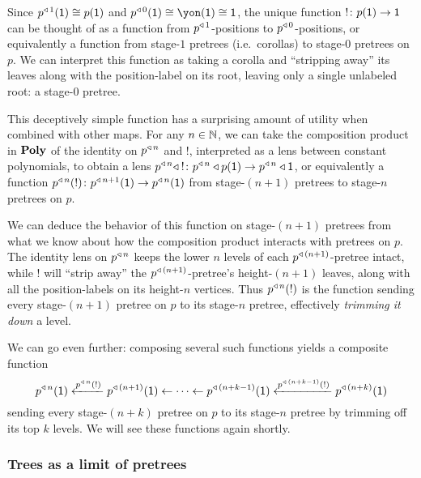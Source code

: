 \documentclass[Book-Poly]{subfiles}
\begin{document}
\begin{example} \label{ex.trim}
Since $p^{\mathbin{\triangleleft}\,1}(\textsf{1})\cong p(\textsf{1})$ and $p\tripow0(\1)\iso\yon(\1)\iso\1$, the unique function $!\colon p(\textsf{1})\to\textsf{1}$ can be thought of as a function from $p^{\mathbin{\triangleleft}\,1}$-positions to $p^{\mathbin{\triangleleft}\,0}$-positions, or equivalently a function from stage-$1$ pretrees (i.e.\ corollas) to stage-$0$ pretrees on $p$.
We can interpret this function as taking a corolla and ``stripping away'' its leaves along with the position-label on its root, leaving only a single unlabeled root: a stage-$0$ pretree.

This deceptively simple function has a surprising amount of utility when combined with other maps.
For any $n\in\mathbb{N}$, we can take the composition product in $\mathbf{Poly}$ of the identity on $p^{\mathbin{\triangleleft}\,n}$ and $!$, interpreted as a lens between constant polynomials, to obtain a lens $p^{\mathbin{\triangleleft}\,n}\mathbin{\triangleleft} \:!\colon p^{\mathbin{\triangleleft}\,n}\mathbin{\triangleleft} p(\textsf{1})\to p^{\mathbin{\triangleleft}\,n}\mathbin{\triangleleft}\textsf{1}$, or equivalently a function $p^{\mathbin{\triangleleft}\,n}(!)\colon p^{\mathbin{\triangleleft}\,n+1}(\textsf{1})\to p^{\mathbin{\triangleleft}\,n}(\textsf{1})$ from stage-$(n+1)$ pretrees to stage-$n$ pretrees on $p$.

We can deduce the behavior of this function on stage-$(n+1)$ pretrees from what we know about how the composition product interacts with pretrees on $p$.
The identity lens on $p^{\mathbin{\triangleleft}\,n}$ keeps the lower $n$ levels of each $p^{\mathbin{\triangleleft}\,(n+1)}$-pretree intact, while $!$ will ``strip away'' the $p^{\mathbin{\triangleleft}\,(n+1)}$-pretree's height-$(n+1)$ leaves, along with all the position-labels on its height-$n$ vertices.
Thus $p^{\mathbin{\triangleleft}\,n}(!)$ is the function sending every stage-$(n+1)$ pretree on $p$ to its stage-$n$ pretree, effectively \emph{trimming it down} a level.

We can go even further: composing several such functions yields a composite function
\begin{equation} \label{eqn.trim}
    p^{\mathbin{\triangleleft}\,n}(\textsf{1}) \xleftarrow{p^{\mathbin{\triangleleft}\,n}(!)}
	p^{\mathbin{\triangleleft}\,(n+1)}(\textsf{1}) \leftarrow\cdots\leftarrow
	p^{\mathbin{\triangleleft}\,(n+k-1)}(\textsf{1}) \xleftarrow{p^{\mathbin{\triangleleft}\,(n+k-1)}(!)}
	p^{\mathbin{\triangleleft}\,(n+k)}(\textsf{1})
\end{equation}
sending every stage-$(n+k)$ pretree on $p$ to its stage-$n$ pretree by trimming off its top $k$ levels.
We will see these functions again shortly.
\end{example}


\subsubsection{Trees as a limit of pretrees}
\end{document}
